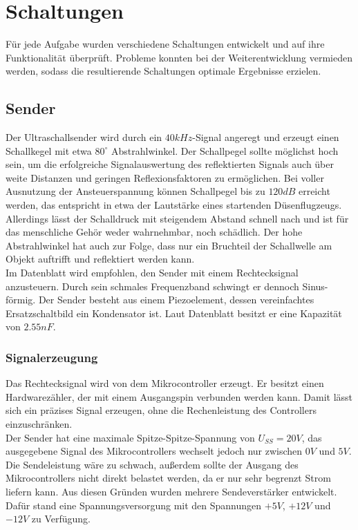 
\chapter{Schaltungen}
Für jede Aufgabe wurden verschiedene Schaltungen entwickelt und auf ihre Funktionalität überprüft. Probleme konnten bei der Weiterentwicklung vermieden werden, sodass die resultierende Schaltungen optimale Ergebnisse erzielen.

\section{Sender}
Der Ultraschallsender wird durch ein $40 kHz$-Signal angeregt und erzeugt einen Schallkegel mit etwa $80^\circ$ Abstrahlwinkel. Der Schallpegel sollte möglichst hoch sein, um die erfolgreiche Signalauswertung des reflektierten Signals auch über weite Distanzen und geringen Reflexionsfaktoren zu ermöglichen. Bei voller Ausnutzung der Ansteuerspannung können Schallpegel bis zu $120dB$ erreicht werden, das entspricht in etwa der Lautstärke eines startenden Düsenflugzeugs. Allerdings lässt der Schalldruck mit steigendem Abstand schnell nach und ist für das menschliche Gehör weder wahrnehmbar, noch schädlich. Der hohe Abstrahlwinkel hat auch zur Folge, dass nur ein Bruchteil der Schallwelle am Objekt auftrifft und reflektiert werden kann. \cite{datasheet:ultraschall}\\
Im Datenblatt wird empfohlen, den Sender mit einem Rechtecksignal anzusteuern. Durch sein schmales Frequenzband schwingt er dennoch Sinus-förmig. Der Sender besteht aus einem Piezoelement, dessen vereinfachtes Ersatzschaltbild ein Kondensator ist. Laut Datenblatt besitzt er eine Kapazität von $2.55nF$.\\


\subsection{Signalerzeugung}
Das Rechtecksignal wird von dem Mikrocontroller erzeugt. Er besitzt einen Hardwarezähler, der mit einem Ausgangspin verbunden werden kann. Damit lässt sich ein präzises Signal erzeugen, ohne die Rechenleistung des Controllers einzuschränken.\\
Der Sender hat eine maximale Spitze-Spitze-Spannung von $U_{SS} = 20V$, das ausgegebene Signal des Mikrocontrollers wechselt jedoch nur zwischen $0V$ und $5V$. Die Sendeleistung wäre zu schwach, außerdem sollte der Ausgang des Mikrocontrollers nicht direkt belastet werden, da er nur sehr begrenzt Strom liefern kann. Aus diesen Gründen wurden mehrere Sendeverstärker entwickelt. Dafür stand eine Spannungsversorgung mit den Spannungen $+5V$, $+12V$ und $-12V$ zu Verfügung.



